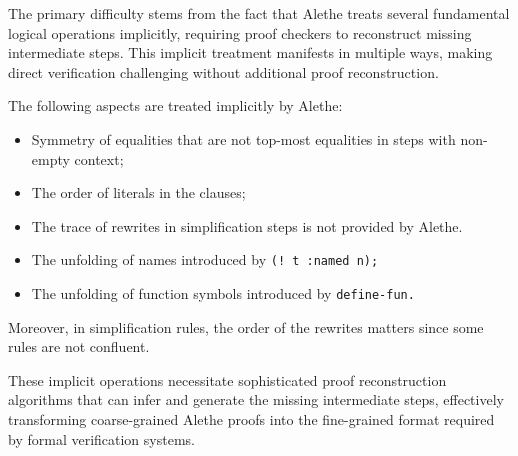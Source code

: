 The primary difficulty stems from the fact that Alethe treats several fundamental logical operations
implicitly, requiring proof checkers to reconstruct missing intermediate steps. This implicit treatment
manifests in multiple ways, making direct verification challenging without additional proof reconstruction.

The following aspects are treated implicitly by Alethe:

\begin{itemize}
  \item Symmetry of equalities that are not top-most equalities in steps with non-empty context;
  \item The order of literals in the clauses;
  \item The trace of rewrites in simplification steps is not provided by Alethe. 
  \item The unfolding of names introduced by \tt{(! t :named n)};
  \item The unfolding of function symbols introduced by \tt{define-fun}.
\end{itemize}

Moreover, in simplification rules, the order of the rewrites matters since some rules are not confluent.

These implicit operations necessitate sophisticated proof reconstruction algorithms that can infer
and generate the missing intermediate steps, effectively transforming coarse-grained Alethe proofs
into the fine-grained format required by formal verification systems.
